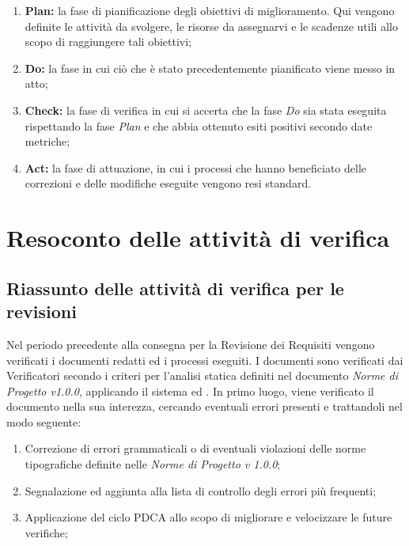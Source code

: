 \documentclass[openany,12pt,a4paper]{report}
\begin{document}
\begin{enumerate}
    \item \textbf{Plan:} la fase di pianificazione degli obiettivi di miglioramento. Qui vengono definite le attività da svolgere, le risorse da assegnarvi e le scadenze utili allo scopo di raggiungere tali obiettivi;
    \item \textbf{Do:} la fase in cui ciò che è stato precedentemente pianificato viene messo in atto;
    \item \textbf{Check:} la fase di verifica in cui si accerta che la fase \textit{Do} sia stata eseguita rispettando la fase \textit{Plan} e che abbia ottenuto esiti positivi secondo date metriche;
    \item \textbf{Act:} la fase di attuazione, in cui i processi che hanno beneficiato delle correzioni e delle modifiche eseguite vengono resi standard.
\end{enumerate}


\chapter{Resoconto delle attività di verifica}

\section{Riassunto delle attività di verifica per le revisioni}

Nel periodo precedente alla consegna per la Revisione dei Requisiti vengono verificati i documenti redatti ed i processi eseguiti. I documenti sono verificati dai Verificatori secondo i criteri per l'analisi statica definiti nel documento \textit{Norme di Progetto v1.0.0}, applicando il sistema  ed . In primo luogo, viene verificato il documento nella sua interezza, cercando eventuali errori presenti e trattandoli nel modo seguente:

\begin{enumerate}
    \item Correzione di errori grammaticali o di eventuali violazioni delle norme tipografiche definite nelle \textit{Norme di Progetto v 1.0.0};
    \item  Segnalazione ed aggiunta alla lista di controllo degli errori più frequenti;
    \item Applicazione del ciclo PDCA allo scopo di migliorare e velocizzare le future verifiche;
\end{enumerate}
\end{document}
